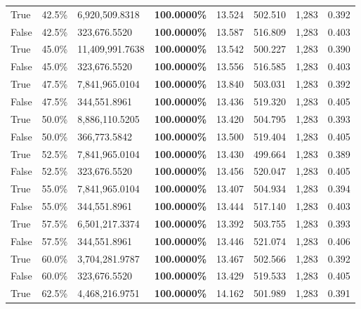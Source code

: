 \begin{table}[H]
\begin{tabular}{lllrllll}
\cline{1-8}
True & 42.5\% & 6,920,509.8318 & \bfseries \color{red} 100.0000\% & 13.524 & 502.510 & 1,283 & 0.392 \\
\cline{1-8}
False & 42.5\% & 323,676.5520 & \bfseries \color{red} 100.0000\% & 13.587 & 516.809 & 1,283 & 0.403 \\
\cline{1-8}
True & 45.0\% & 11,409,991.7638 & \bfseries \color{red} 100.0000\% & 13.542 & 500.227 & 1,283 & 0.390 \\
\cline{1-8}
False & 45.0\% & 323,676.5520 & \bfseries \color{red} 100.0000\% & 13.556 & 516.585 & 1,283 & 0.403 \\
\cline{1-8}
True & 47.5\% & 7,841,965.0104 & \bfseries \color{red} 100.0000\% & 13.840 & 503.031 & 1,283 & 0.392 \\
\cline{1-8}
False & 47.5\% & 344,551.8961 & \bfseries \color{red} 100.0000\% & 13.436 & 519.320 & 1,283 & 0.405 \\
\cline{1-8}
True & 50.0\% & 8,886,110.5205 & \bfseries \color{red} 100.0000\% & 13.420 & 504.795 & 1,283 & 0.393 \\
\cline{1-8}
False & 50.0\% & 366,773.5842 & \bfseries \color{red} 100.0000\% & 13.500 & 519.404 & 1,283 & 0.405 \\
\cline{1-8}
True & 52.5\% & 7,841,965.0104 & \bfseries \color{red} 100.0000\% & 13.430 & 499.664 & 1,283 & 0.389 \\
\cline{1-8}
False & 52.5\% & 323,676.5520 & \bfseries \color{red} 100.0000\% & 13.456 & 520.047 & 1,283 & 0.405 \\
\cline{1-8}
True & 55.0\% & 7,841,965.0104 & \bfseries \color{red} 100.0000\% & 13.407 & 504.934 & 1,283 & 0.394 \\
\cline{1-8}
False & 55.0\% & 344,551.8961 & \bfseries \color{red} 100.0000\% & 13.444 & 517.140 & 1,283 & 0.403 \\
\cline{1-8}
True & 57.5\% & 6,501,217.3374 & \bfseries \color{red} 100.0000\% & 13.392 & 503.755 & 1,283 & 0.393 \\
\cline{1-8}
False & 57.5\% & 344,551.8961 & \bfseries \color{red} 100.0000\% & 13.446 & 521.074 & 1,283 & 0.406 \\
\cline{1-8}
True & 60.0\% & 3,704,281.9787 & \bfseries \color{red} 100.0000\% & 13.467 & 502.566 & 1,283 & 0.392 \\
\cline{1-8}
False & 60.0\% & 323,676.5520 & \bfseries \color{red} 100.0000\% & 13.429 & 519.533 & 1,283 & 0.405 \\
\cline{1-8}
True & 62.5\% & 4,468,216.9751 & \bfseries \color{red} 100.0000\% & 14.162 & 501.989 & 1,283 & 0.391 \\

\end{tabular}
\end{table}
